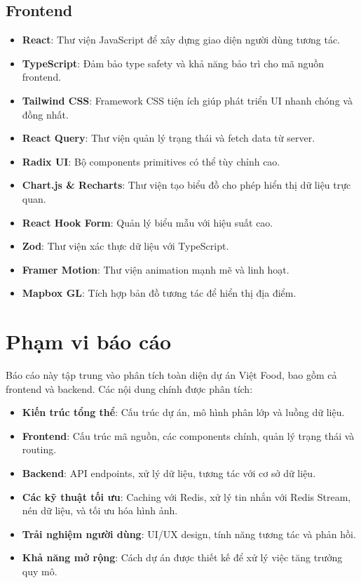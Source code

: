 \subsection{Frontend}
\begin{itemize}
    \item \textbf{React}: Thư viện JavaScript để xây dựng giao diện người dùng tương tác.
    \item \textbf{TypeScript}: Đảm bảo type safety và khả năng bảo trì cho mã nguồn frontend.
    \item \textbf{Tailwind CSS}: Framework CSS tiện ích giúp phát triển UI nhanh chóng và đồng nhất.
    \item \textbf{React Query}: Thư viện quản lý trạng thái và fetch data từ server.
    \item \textbf{Radix UI}: Bộ components primitives có thể tùy chỉnh cao.
    \item \textbf{Chart.js \& Recharts}: Thư viện tạo biểu đồ cho phép hiển thị dữ liệu trực quan.
    \item \textbf{React Hook Form}: Quản lý biểu mẫu với hiệu suất cao.
    \item \textbf{Zod}: Thư viện xác thực dữ liệu với TypeScript.
    \item \textbf{Framer Motion}: Thư viện animation mạnh mẽ và linh hoạt.
    \item \textbf{Mapbox GL}: Tích hợp bản đồ tương tác để hiển thị địa điểm.
\end{itemize}

\section{Phạm vi báo cáo}
Báo cáo này tập trung vào phân tích toàn diện dự án Việt Food, bao gồm cả frontend và backend. Các nội dung chính được phân tích:

\begin{itemize}
    \item \textbf{Kiến trúc tổng thể}: Cấu trúc dự án, mô hình phân lớp và luồng dữ liệu.
    \item \textbf{Frontend}: Cấu trúc mã nguồn, các components chính, quản lý trạng thái và routing.
    \item \textbf{Backend}: API endpoints, xử lý dữ liệu, tương tác với cơ sở dữ liệu.
    \item \textbf{Các kỹ thuật tối ưu}: Caching với Redis, xử lý tin nhắn với Redis Stream, nén dữ liệu, và tối ưu hóa hình ảnh.
    \item \textbf{Trải nghiệm người dùng}: UI/UX design, tính năng tương tác và phản hồi.
    \item \textbf{Khả năng mở rộng}: Cách dự án được thiết kế để xử lý việc tăng trưởng quy mô.
\end{itemize}

